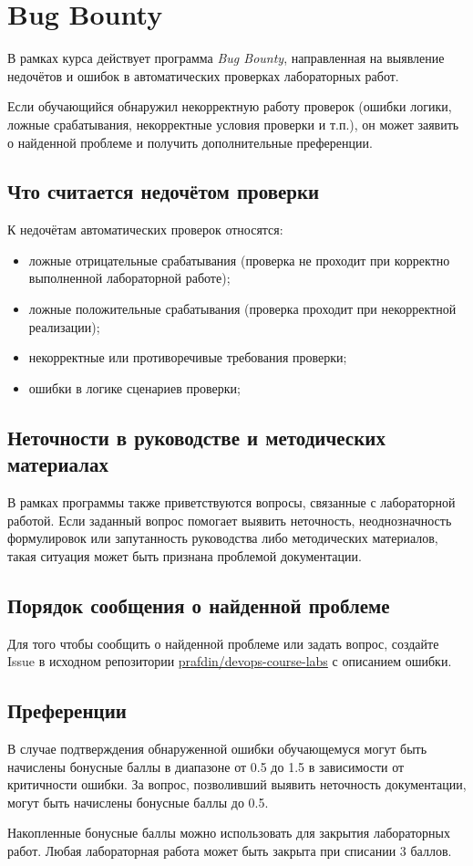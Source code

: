 \documentclass[12pt,a4paper]{article}
\begin{document}
\section{Bug Bounty}
В рамках курса действует программа \textit{Bug Bounty}, направленная на выявление недочётов и ошибок в автоматических проверках лабораторных работ.

Если обучающийся обнаружил некорректную работу проверок (ошибки логики, ложные срабатывания, некорректные условия проверки и т.п.),
он может заявить о найденной проблеме и получить дополнительные преференции.

\subsection{Что считается недочётом проверки}

К недочётам автоматических проверок относятся:
\begin{itemize}
    \item ложные отрицательные срабатывания (проверка не проходит при корректно выполненной лабораторной работе);
    \item ложные положительные срабатывания (проверка проходит при некорректной реализации);
    \item некорректные или противоречивые требования проверки;
    \item ошибки в логике сценариев проверки;
\end{itemize}

\subsection{Неточности в руководстве и методических материалах}
В рамках программы также приветствуются вопросы, связанные с лабораторной работой. Если заданный вопрос помогает выявить
неточность, неоднозначность формулировок или запутанность руководства либо методических материалов, такая ситуация может
быть признана проблемой документации.

\subsection{Порядок сообщения о найденной проблеме}

Для того чтобы сообщить о найденной проблеме или задать вопрос, создайте Issue в исходном репозитории \href{https://github.com/prafdin/devops-course-labs}{prafdin/devops-course-labs}
с описанием ошибки.

\subsection{Преференции}
В случае подтверждения обнаруженной ошибки обучающемуся могут быть начислены бонусные баллы в диапазоне от 0.5 до 1.5 в зависимости от критичности ошибки.
За вопрос, позволивший выявить неточность документации, могут быть начислены бонусные баллы до 0.5.

Накопленные бонусные баллы можно использовать для закрытия лабораторных работ.
Любая лабораторная работа может быть закрыта при списании 3 баллов.
\end{document}
